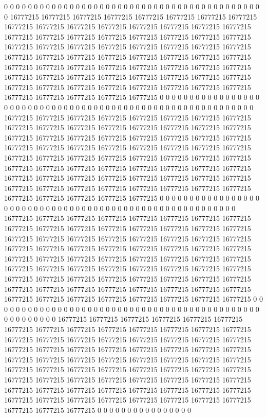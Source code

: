 0 0 0 0 0 0 0 0 0 0 0 0 0 0 0 0 0 0 0 0 0 0 0 0 0 0 0 0 0 0 0 0 0 0 0 0 0 0 0 0 0 0 0 0 16777215 16777215 16777215 16777215 16777215 16777215 16777215 16777215 16777215 16777215 16777215 16777215 16777215 16777215 16777215 16777215 16777215 16777215 16777215 16777215 16777215 16777215 16777215 16777215 16777215 16777215 16777215 16777215 16777215 16777215 16777215 16777215 16777215 16777215 16777215 16777215 16777215 16777215 16777215 16777215 16777215 16777215 16777215 16777215 16777215 16777215 16777215 16777215 16777215 16777215 16777215 16777215 16777215 16777215 16777215 16777215 16777215 16777215 16777215 16777215 16777215 16777215 16777215 16777215 16777215 16777215 16777215 16777215 16777215 0 0 0 0 0 0 0 0 0 0 0 0 0 0 0
0 0 0 0 0 0 0 0 0 0 0 0 0 0 0 0 0 0 0 0 0 0 0 0 0 0 0 0 0 0 0 0 0 0 0 0 0 0 0 0 0 0 0 0 16777215 16777215 16777215 16777215 16777215 16777215 16777215 16777215 16777215 16777215 16777215 16777215 16777215 16777215 16777215 16777215 16777215 16777215 16777215 16777215 16777215 16777215 16777215 16777215 16777215 16777215 16777215 16777215 16777215 16777215 16777215 16777215 16777215 16777215 16777215 16777215 16777215 16777215 16777215 16777215 16777215 16777215 16777215 16777215 16777215 16777215 16777215 16777215 16777215 16777215 16777215 16777215 16777215 16777215 16777215 16777215 16777215 16777215 16777215 16777215 16777215 16777215 16777215 16777215 16777215 16777215 16777215 16777215 16777215 0 0 0 0 0 0 0 0 0 0 0 0 0 0 0
0 0 0 0 0 0 0 0 0 0 0 0 0 0 0 0 0 0 0 0 0 0 0 0 0 0 0 0 0 0 0 0 0 0 0 0 0 0 0 0 0 16777215 16777215 16777215 16777215 16777215 16777215 16777215 16777215 16777215 16777215 16777215 16777215 16777215 16777215 16777215 16777215 16777215 16777215 16777215 16777215 16777215 16777215 16777215 16777215 16777215 16777215 16777215 16777215 16777215 16777215 16777215 16777215 16777215 16777215 16777215 16777215 16777215 16777215 16777215 16777215 16777215 16777215 16777215 16777215 16777215 16777215 16777215 16777215 16777215 16777215 16777215 16777215 16777215 16777215 16777215 16777215 16777215 16777215 16777215 16777215 16777215 16777215 16777215 16777215 16777215 16777215 16777215 16777215 16777215 16777215 16777215 16777215 0 0 0 0 0 0 0 0 0 0 0 0 0 0 0
0 0 0 0 0 0 0 0 0 0 0 0 0 0 0 0 0 0 0 0 0 0 0 0 0 0 0 0 0 0 0 0 0 0 0 0 0 0 0 16777215 16777215 16777215 16777215 16777215 16777215 16777215 16777215 16777215 16777215 16777215 16777215 16777215 16777215 16777215 16777215 16777215 16777215 16777215 16777215 16777215 16777215 16777215 16777215 16777215 16777215 16777215 16777215 16777215 16777215 16777215 16777215 16777215 16777215 16777215 16777215 16777215 16777215 16777215 16777215 16777215 16777215 16777215 16777215 16777215 16777215 16777215 16777215 16777215 16777215 16777215 16777215 16777215 16777215 16777215 16777215 16777215 16777215 16777215 16777215 16777215 16777215 16777215 16777215 16777215 16777215 16777215 16777215 16777215 16777215 16777215 16777215 16777215 0 0 0 0 0 0 0 0 0 0 0 0 0 0 0 0
